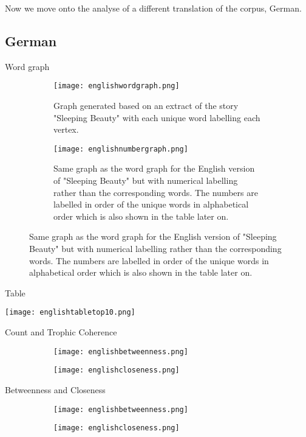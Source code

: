 Now we move onto the analyse of a different translation of the corpus, German.

\subsection{German}

Word graph
\begin{figure}[H]
\centering
\begin{subfigure}{.45\textwidth}
	\texttt{[image: englishwordgraph.png]}
	\caption{Graph generated based on an extract of the story "Sleeping Beauty" with each unique word labelling each vertex.}
	\label{fig:engword}
\end{subfigure}
\hfill
\begin{subfigure}{.45\textwidth}
	\texttt{[image: englishnumbergraph.png]}
	\caption{Same graph as the word graph for the English version of "Sleeping Beauty" but with numerical labelling rather than the corresponding words. The numbers are labelled in order of the unique words in alphabetical order which is also shown in the table later on.}
	\label{fig:engnum}
\end{subfigure}
\end{figure}

Table
\begin{table}[H]
	\centering
	\texttt{[image: englishtabletop10.png]}
	\caption{First ten entries of the dataset generated for the english version of "Sleeping Beauty" in a table format. }
	\label{table:english}
\end{table}

Count and Trophic Coherence

\begin{figure}[H]
\centering
\begin{subfigure}{.45\textwidth}
	\hspace{-1cm} 
	\texttt{[image: englishbetweenness.png]}
	\caption{}
	\label{fig:engbc}
\end{subfigure}
\hfill
\begin{subfigure}{.45\textwidth}
	\hspace{-1cm} 
	\texttt{[image: englishcloseness.png]}
	\caption{}
	\label{fig:engcc}
\end{subfigure}
\end{figure}

Betweenness and Closeness

\begin{figure}[H]
\centering
\begin{subfigure}{.45\textwidth}
	\hspace{-1cm} 
	\texttt{[image: englishbetweenness.png]}
	\caption{}
	\label{fig:engbc}
\end{subfigure}
\hfill
\begin{subfigure}{.45\textwidth}
	\hspace{-1cm} 
	\texttt{[image: englishcloseness.png]}
	\caption{}
	\label{fig:engcc}
\end{subfigure}
\end{figure}

